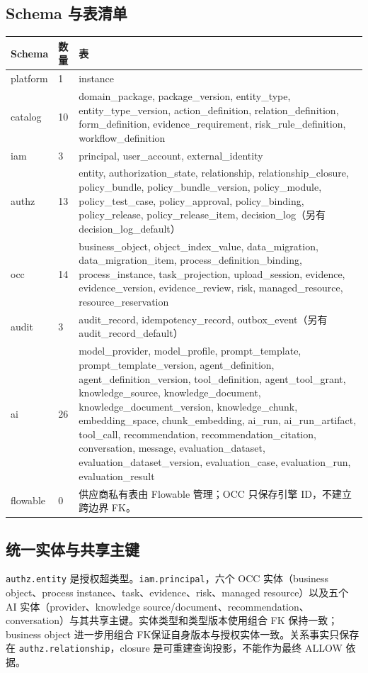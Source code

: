 \documentclass[journal,a4paper,onecolumn]{IEEEtran}
\begin{document}
\subsection{Schema 与表清单}
\begin{longtable}{p{}p{}p{}}
\toprule
Schema & 数量 & 表 \\
\midrule
\endhead
platform & 1 & instance\\
catalog & 10 & domain\_package, package\_version, entity\_type, entity\_type\_version, action\_definition, relation\_definition, form\_definition, evidence\_requirement, risk\_rule\_definition, workflow\_definition\\
iam & 3 & principal, user\_account, external\_identity\\
authz & 13 & entity, authorization\_state, relationship, relationship\_closure, policy\_bundle, policy\_bundle\_version, policy\_module, policy\_test\_case, policy\_approval, policy\_binding, policy\_release, policy\_release\_item, decision\_log（另有 decision\_log\_default）\\
occ & 14 & business\_object, object\_index\_value, data\_migration, data\_migration\_item, process\_definition\_binding, process\_instance, task\_projection, upload\_session, evidence, evidence\_version, evidence\_review, risk, managed\_resource, resource\_reservation\\
audit & 3 & audit\_record, idempotency\_record, outbox\_event（另有 audit\_record\_default）\\
ai & 26 & model\_provider, model\_profile, prompt\_template, prompt\_template\_version, agent\_definition, agent\_definition\_version, tool\_definition, agent\_tool\_grant, knowledge\_source, knowledge\_document, knowledge\_document\_version, knowledge\_chunk, embedding\_space, chunk\_embedding, ai\_run, ai\_run\_artifact, tool\_call, recommendation, recommendation\_citation, conversation, message, evaluation\_dataset, evaluation\_dataset\_version, evaluation\_case, evaluation\_run, evaluation\_result\\
flowable & 0 & 供应商私有表由 Flowable 管理；OCC 只保存引擎 ID，不建立跨边界 FK。\\
\bottomrule
\end{longtable}

\subsection{统一实体与共享主键}
\texttt{authz.entity} 是授权超类型。\texttt{iam.principal}，六个 OCC 实体（business object、process instance、task、evidence、risk、managed resource）以及五个 AI 实体（provider、knowledge source/document、recommendation、conversation）与其共享主键。实体类型和类型版本使用组合 FK 保持一致；business object 进一步用组合 FK保证自身版本与授权实体一致。关系事实只保存在 \texttt{authz.relationship}，closure 是可重建查询投影，不能作为最终 ALLOW 依据。
\end{document}
